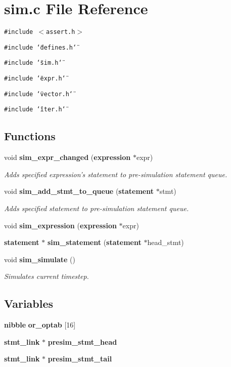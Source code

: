 \section{sim.c File Reference}
\label{sim_8c}
{\tt \#include $<$assert.h$>$}\par
{\tt \#include \char`\"{}defines.h\char`\"{}}\par
{\tt \#include \char`\"{}sim.h\char`\"{}}\par
{\tt \#include \char`\"{}expr.h\char`\"{}}\par
{\tt \#include \char`\"{}vector.h\char`\"{}}\par
{\tt \#include \char`\"{}iter.h\char`\"{}}\par
\subsection*{Functions}
\begin{CompactItemize}
\item 
void {\bf sim\_\-expr\_\-changed} ({\bf expression} $\ast$expr)
\begin{CompactList}\small\item\em Adds specified expression's statement to pre-simulation statement queue.\item\end{CompactList}\item 
void {\bf sim\_\-add\_\-stmt\_\-to\_\-queue} ({\bf statement} $\ast$stmt)
\begin{CompactList}\small\item\em Adds specified statement to pre-simulation statement queue.\item\end{CompactList}\item 
void {\bf sim\_\-expression} ({\bf expression} $\ast$expr)
\item 
{\bf statement} $\ast$ {\bf sim\_\-statement} ({\bf statement} $\ast$head\_\-stmt)
\item 
void {\bf sim\_\-simulate} ()
\begin{CompactList}\small\item\em Simulates current timestep.\item\end{CompactList}\end{CompactItemize}
\subsection*{Variables}
\begin{CompactItemize}
\item 
{\bf nibble} {\bf or\_\-optab} [16]
\item 
{\bf stmt\_\-link} $\ast$ {\bf presim\_\-stmt\_\-head}
\item 
{\bf stmt\_\-link} $\ast$ {\bf presim\_\-stmt\_\-tail}
\end{CompactItemize}


